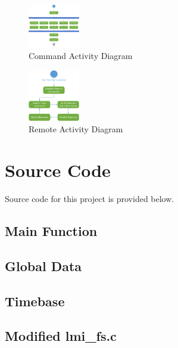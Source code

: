 \documentclass[12pt]{article} %
\begin{document}
    \begin{figure}[H]
      \centering
      \includegraphics[width=0.2\textwidth]{../design/command_activity.png}
      \caption{Command Activity Diagram}
      \label{fig:commandActivity}
    \end{figure}

    \begin{figure}[H]
      \centering
      \includegraphics[width=0.2\textwidth]{../design/remote_activity.png}
      \caption{Remote Activity Diagram}
      \label{fig:remoteActivity}
    \end{figure}

    \pagebreak

    \section{Source Code}

    Source code for this project is provided below.

    \subsection{Main Function}
    

    \subsection{Global Data}
    
    

    \subsection{Timebase}
    

    \subsection{Modified lmi\_fs.c}
    
\end{document}
